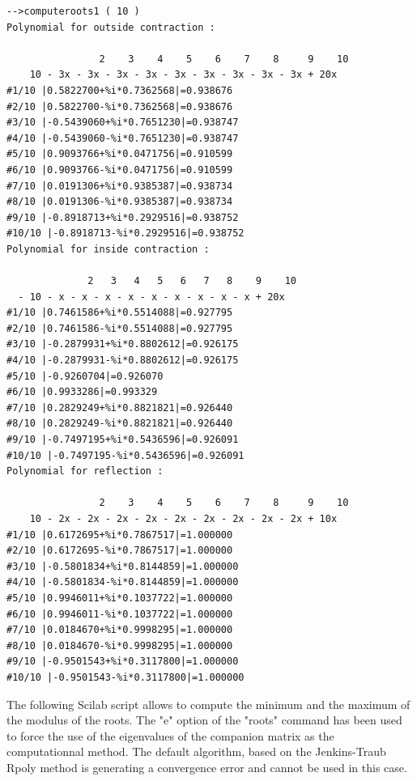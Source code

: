 \begin{tiny}
\begin{verbatim}
-->computeroots1 ( 10 )
Polynomial for outside contraction :
 
                2    3    4    5    6    7    8     9    10  
    10 - 3x - 3x - 3x - 3x - 3x - 3x - 3x - 3x - 3x + 20x    
#1/10 |0.5822700+%i*0.7362568|=0.938676
#2/10 |0.5822700-%i*0.7362568|=0.938676
#3/10 |-0.5439060+%i*0.7651230|=0.938747
#4/10 |-0.5439060-%i*0.7651230|=0.938747
#5/10 |0.9093766+%i*0.0471756|=0.910599
#6/10 |0.9093766-%i*0.0471756|=0.910599
#7/10 |0.0191306+%i*0.9385387|=0.938734
#8/10 |0.0191306-%i*0.9385387|=0.938734
#9/10 |-0.8918713+%i*0.2929516|=0.938752
#10/10 |-0.8918713-%i*0.2929516|=0.938752
Polynomial for inside contraction :
 
              2   3   4   5   6   7   8    9    10  
  - 10 - x - x - x - x - x - x - x - x - x + 20x    
#1/10 |0.7461586+%i*0.5514088|=0.927795
#2/10 |0.7461586-%i*0.5514088|=0.927795
#3/10 |-0.2879931+%i*0.8802612|=0.926175
#4/10 |-0.2879931-%i*0.8802612|=0.926175
#5/10 |-0.9260704|=0.926070
#6/10 |0.9933286|=0.993329
#7/10 |0.2829249+%i*0.8821821|=0.926440
#8/10 |0.2829249-%i*0.8821821|=0.926440
#9/10 |-0.7497195+%i*0.5436596|=0.926091
#10/10 |-0.7497195-%i*0.5436596|=0.926091
Polynomial for reflection :
 
                2    3    4    5    6    7    8     9    10  
    10 - 2x - 2x - 2x - 2x - 2x - 2x - 2x - 2x - 2x + 10x    
#1/10 |0.6172695+%i*0.7867517|=1.000000
#2/10 |0.6172695-%i*0.7867517|=1.000000
#3/10 |-0.5801834+%i*0.8144859|=1.000000
#4/10 |-0.5801834-%i*0.8144859|=1.000000
#5/10 |0.9946011+%i*0.1037722|=1.000000
#6/10 |0.9946011-%i*0.1037722|=1.000000
#7/10 |0.0184670+%i*0.9998295|=1.000000
#8/10 |0.0184670-%i*0.9998295|=1.000000
#9/10 |-0.9501543+%i*0.3117800|=1.000000
#10/10 |-0.9501543-%i*0.3117800|=1.000000
\end{verbatim}
\end{tiny}

The following Scilab script allows to compute the minimum and 
the maximum of the modulus of the roots. 
The "e" option of the "roots" command has been used to force the 
use of the eigenvalues of the companion matrix as the computationnal 
method. The default algorithm, based on the Jenkins-Traub Rpoly
method is generating a convergence error and cannot be used 
in this case.

